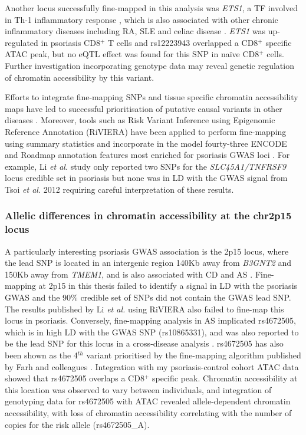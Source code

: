 Another locus successfully fine-mapped in this analysis was \textit{ETS1}, a TF involved in Th-1 inflammatory response \parencite{Grenningloh2005}, which is also associated with other chronic inflammatory diseases including RA, SLE and celiac disease \parencite{Okada2014,Trynka2011,Bentham2015}. \textit{ETS1} was up-regulated in psoriasis CD8$^+$ T cells and rs12223943 overlapped a CD8$^+$ specific ATAC peak, but no eQTL effect was found for this SNP in na\"{i}ve CD8$^+$ cells. Further investigation incorporating genotype data may reveal genetic regulation of chromatin accessibility by this variant.

Efforts to integrate fine-mapping SNPs and tissue specific chromatin accessibility maps have led to successful prioritisation of putative causal variants in other diseases \parencite{Stefan2014}. Moreover, tools such as Risk Variant Inference using Epigenomic Reference Annotation (RiVIERA) have been applied to perform fine-mapping using summary statistics and incorporate in the model fourty-three ENCODE and Roadmap annotation features most enriched for psoriasis GWAS loci \parencite{Li2016}. For example, Li \textit{et al.} study only reported two SNPs for the \textit{SLC45A1/TNFRSF9} locus credible set in psoriasis but none was in LD with the GWAS signal from Tsoi \textit{et al.} 2012 requiring careful interpretation of these results. 


\subsubsection{Allelic differences in chromatin accessibility at the chr2p15 locus}

A particularly interesting psoriasis GWAS association is the 2p15 locus, where the lead SNP is located in an intergenic region 140Kb away from \textit{B3GNT2} and 150Kb away from \textit{TMEM1}, and is also associated with CD and AS \parencite{Jostins2012,Cortes2013}. Fine-mapping at 2p15 in this thesis failed to identify a signal in LD with the psoriasis GWAS and the 90\% credible set of SNPs did not contain the GWAS lead SNP. The results published by Li \textit{et al.} using RiVIERA also failed to fine-map this locus in psoriasis. Conversely, fine-mapping analysis in AS implicated rs4672505, which is in high LD with the GWAS SNP (rs10865331), and was also reported to be the lead SNP for this locus in a cross-disease analysis \parencite{Ellinghaus2016}. rs4672505 has also been shown as the 4$^{th}$ variant prioritised by the fine-mapping algorithm published by Farh and colleagues \parencite{Farh2015}. Integration with my psoriasis-control cohort ATAC data showed that rs4672505 overlaps a CD8$^+$ specific peak. Chromatin accessibility at this location was observed to vary between individuals, and integration of genotyping data for rs4672505 with ATAC revealed allele-dependent chromatin accessibility, with loss of chromatin accessibility correlating with the number of copies for the risk allele (rs4672505\_A). 

